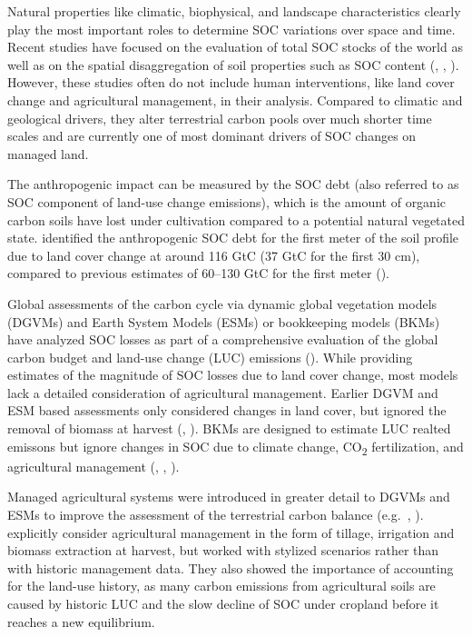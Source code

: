 \documentclass[gc, manuscript]{copernicus}
\begin{document}
Natural properties like climatic, biophysical, and landscape characteristics clearly play the most important roles to determine SOC variations over space and time. Recent studies have focused on the evaluation of total SOC stocks of the world as well as on the spatial disaggregation of soil properties such as SOC content (\citep{batjes_harmonized_2016}, \citep{hengl_soilgrids250m_2017}, \citep{fao_global_2018}). However, these studies often do not include human interventions, like land cover change and agricultural management, in their analysis. Compared to climatic and geological drivers, they alter terrestrial carbon pools over much shorter time scales and are currently one of most dominant drivers of SOC changes on managed land.

The anthropogenic impact can be measured by the SOC debt (also referred to as SOC component of land-use change emissions), which is the amount of organic carbon soils have lost under cultivation compared to a potential natural vegetated state. \citep{sanderman_soil_2017} identified the anthropogenic SOC debt for the first meter of the soil profile due to land cover change at around 116 GtC (37 GtC for the first 30 cm), compared to previous estimates of 60--130 GtC for the first meter (\citep{lal_world_2001}).

Global assessments of the carbon cycle via dynamic global vegetation models (DGVMs) and Earth System Models (ESMs) or bookkeeping models (BKMs) have analyzed SOC losses as part of a comprehensive evaluation of the global carbon budget and land-use change (LUC) emissions (\citep{friedlingstein_global_2019}). While providing estimates of the magnitude of SOC losses due to land cover change, most models lack a detailed consideration of agricultural management. Earlier DGVM and ESM based assessments only considered changes in land cover, but ignored the removal of biomass at harvest (\citep{strassmann_simulating_2008}, \citep{betts_climate_2015}). BKMs are designed to estimate LUC realted emissons but ignore changes in SOC due to climate change, CO\textsubscript{2} fertilization, and agricultural management (\citep{friedlingstein_global_2019}, \citep{houghton_carbon_2012}, \citep{hansis_relevance_2015}).

Managed agricultural systems were introduced in greater detail to DGVMs and ESMs to improve the assessment of the terrestrial carbon balance (e.g.~\citep{bondeau_modelling_2007}, \citep{lindeskog_implications_2013}). \citep{pugh_simulated_2015} explicitly consider agricultural management in the form of tillage, irrigation and biomass extraction at harvest, but worked with stylized scenarios rather than with historic management data. They also showed the importance of accounting for the land-use history, as many carbon emissions from agricultural soils are caused by historic LUC and the slow decline of SOC under cropland before it reaches a new equilibrium.
\end{document}
